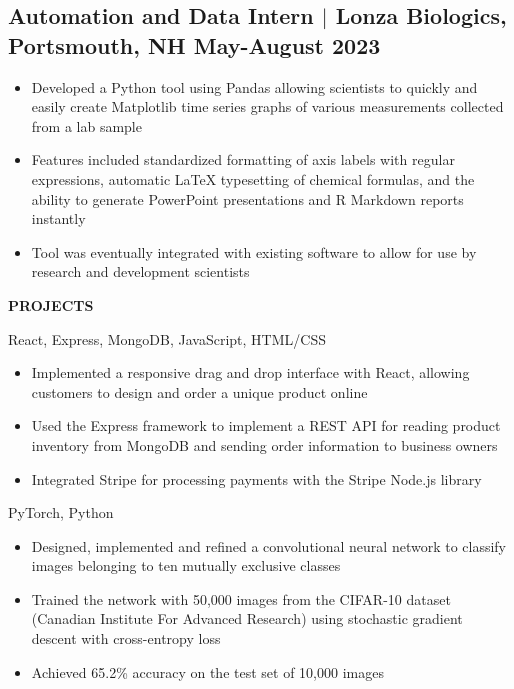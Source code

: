 \documentclass{article}
\begin{document}
\subsection*{Automation and Data Intern $\vert$ Lonza Biologics, Portsmouth, NH \hfill May-August 2023}
\begin{itemize}
  \setlength\itemsep{0.025em}
  \item Developed a Python tool using Pandas allowing scientists to quickly and easily create Matplotlib time series graphs of various measurements collected from a lab sample
  \item Features included standardized formatting of axis labels with regular expressions, automatic LaTeX typesetting of chemical formulas, and the ability to generate PowerPoint presentations and R Markdown reports instantly
  \item Tool was eventually integrated with existing software to allow for use by research and development scientists
\end{itemize}


\vspace{5pt}
\begin{center}\selectfont\textbf{\lsstyle PROJECTS}\end{center}

{React, Express, MongoDB, JavaScript, HTML/CSS}
{\begin{itemize}
  \setlength\itemsep{0.025em}
  \item Implemented a responsive drag and drop interface with React, allowing customers to design and order a unique product online
  \item Used the Express framework to implement a REST API for reading product inventory from MongoDB and sending order information to business owners
  \item Integrated Stripe for processing payments with the Stripe Node.js library
\end{itemize}}

{PyTorch, Python}
{\begin{itemize}
  \setlength\itemsep{0.025em}
  \item Designed, implemented and refined a convolutional neural network to classify images belonging to ten mutually exclusive classes
  \item Trained the network with 50,000 images from the CIFAR-10 dataset (Canadian Institute For Advanced Research) using stochastic gradient descent with cross-entropy loss
  \item Achieved 65.2\% accuracy on the test set of 10,000 images
\end{itemize}}
\end{document}
